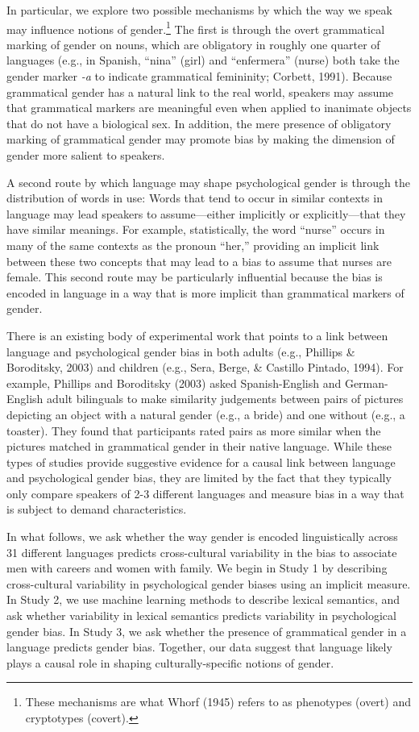 \documentclass[10pt, letterpaper]{article}
\begin{document}
In particular, we explore two possible mechanisms by which the way we
speak may influence notions of
gender.\footnote{These mechanisms are what Whorf (1945) refers to as phenotypes (overt) and cryptotypes (covert).}
The first is through the overt grammatical marking of gender on nouns,
which are obligatory in roughly one quarter of languages (e.g., in
Spanish, ``nina'' (girl) and ``enfermera'' (nurse) both take the gender
marker \emph{-a} to indicate grammatical femininity; Corbett, 1991).
Because grammatical gender has a natural link to the real world,
speakers may assume that grammatical markers are meaningful even when
applied to inanimate objects that do not have a biological sex. In
addition, the mere presence of obligatory marking of grammatical gender
may promote bias by making the dimension of gender more salient to
speakers.

A second route by which language may shape psychological gender is
through the distribution of words in use: Words that tend to occur in
similar contexts in language may lead speakers to assume---either
implicitly or explicitly---that they have similar meanings. For example,
statistically, the word ``nurse'' occurs in many of the same contexts as
the pronoun ``her,'' providing an implicit link between these two
concepts that may lead to a bias to assume that nurses are female. This
second route may be particularly influential because the bias is encoded
in language in a way that is more implicit than grammatical markers of
gender.

There is an existing body of experimental work that points to a link
between language and psychological gender bias in both adults (e.g.,
Phillips \& Boroditsky, 2003) and children (e.g., Sera, Berge, \&
Castillo Pintado, 1994). For example, Phillips and Boroditsky (2003)
asked Spanish-English and German-English adult bilinguals to make
similarity judgements between pairs of pictures depicting an object with
a natural gender (e.g., a bride) and one without (e.g., a toaster). They
found that participants rated pairs as more similar when the pictures
matched in grammatical gender in their native language. While these
types of studies provide suggestive evidence for a causal link between
language and psychological gender bias, they are limited by the fact
that they typically only compare speakers of 2-3 different languages and
measure bias in a way that is subject to demand characteristics.

In what follows, we ask whether the way gender is encoded linguistically
across 31 different languages predicts cross-cultural variability in the
bias to associate men with careers and women with family. We begin in
Study 1 by describing cross-cultural variability in psychological gender
biases using an implicit measure. In Study 2, we use machine learning
methods to describe lexical semantics, and ask whether variability in
lexical semantics predicts variability in psychological gender bias. In
Study 3, we ask whether the presence of grammatical gender in a language
predicts gender bias. Together, our data suggest that language likely
plays a causal role in shaping culturally-specific notions of gender.
\end{document}
